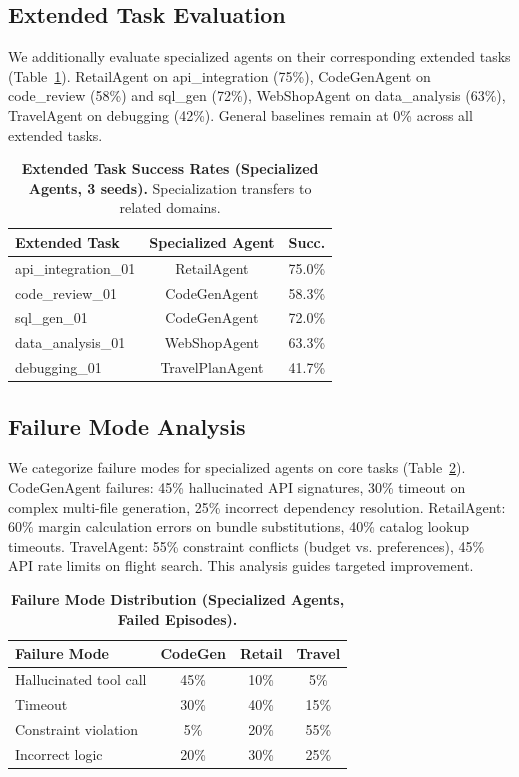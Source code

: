 \documentclass[letterpaper, 10 pt, conference]{ieeeconf}
\begin{document}
\subsection{Extended Task Evaluation}
\label{sec:extended}

We additionally evaluate specialized agents on their corresponding extended tasks (Table~\ref{tab:extended}). RetailAgent on api\_integration (75\%), CodeGenAgent on code\_review (58\%) and sql\_gen (72\%), WebShopAgent on data\_analysis (63\%), TravelAgent on debugging (42\%). General baselines remain at 0\% across all extended tasks.

\begin{table}[t]
\centering
\caption{\textbf{Extended Task Success Rates (Specialized Agents, 3 seeds).} Specialization transfers to related domains.}
\label{tab:extended}
\footnotesize
\setlength{\tabcolsep}{3.5pt}
\begin{tabular}{lcc}
\toprule
\textbf{Extended Task} & \textbf{Specialized Agent} & \textbf{Succ.} \\
\midrule
api\_integration\_01 & RetailAgent & 75.0\% \\
code\_review\_01 & CodeGenAgent & 58.3\% \\
sql\_gen\_01 & CodeGenAgent & 72.0\% \\
data\_analysis\_01 & WebShopAgent & 63.3\% \\
debugging\_01 & TravelPlanAgent & 41.7\% \\
\bottomrule
\end{tabular}
\end{table}

\subsection{Failure Mode Analysis}
\label{sec:failure_modes}

We categorize failure modes for specialized agents on core tasks (Table~\ref{tab:failures}). CodeGenAgent failures: 45\% hallucinated API signatures, 30\% timeout on complex multi-file generation, 25\% incorrect dependency resolution. RetailAgent: 60\% margin calculation errors on bundle substitutions, 40\% catalog lookup timeouts. TravelAgent: 55\% constraint conflicts (budget vs. preferences), 45\% API rate limits on flight search. This analysis guides targeted improvement.

\begin{table}[t]
\centering
\caption{\textbf{Failure Mode Distribution (Specialized Agents, Failed Episodes).}}
\label{tab:failures}
\footnotesize
\setlength{\tabcolsep}{3.5pt}
\begin{tabular}{lccc}
\toprule
\textbf{Failure Mode} & \textbf{CodeGen} & \textbf{Retail} & \textbf{Travel} \\
\midrule
Hallucinated tool call & 45\% & 10\% & 5\% \\
Timeout & 30\% & 40\% & 15\% \\
Constraint violation & 5\% & 20\% & 55\% \\
Incorrect logic & 20\% & 30\% & 25\% \\
\bottomrule
\end{tabular}
\end{table}
\end{document}
